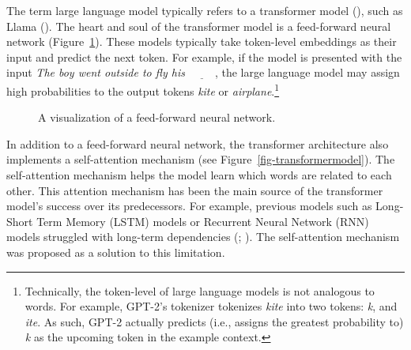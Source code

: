 \documentclass[
  12pt,
  letterpaper,
]{scrreport}
\begin{document}
The term large language model typically refers to a transformer model
(), such
as Llama ().
The heart and soul of the transformer model is a feed-forward neural
network (Figure~\ref{fig-neuralnet}). These models typically take
token-level embeddings as their input and predict the next token. For
example, if the model is presented with the input \emph{The boy went
outside to fly his} \(\underline{\hspace{1cm}}\), the large language
model may assign high probabilities to the output tokens \emph{kite} or
\emph{airplane}.\footnote{Technically, the token-level of large language
  models is not analogous to words. For example, GPT-2's tokenizer
  tokenizes \emph{kite} into two tokens: \emph{k}, and \emph{ite}. As
  such, GPT-2 actually predicts (i.e., assigns the greatest probability
  to) \emph{k} as the upcoming token in the example context.}

\begin{figure}[htbp]

\caption{\label{fig-neuralnet}A visualization of a feed-forward neural
network.}


\end{figure}%

In addition to a feed-forward neural network, the transformer
architecture also implements a self-attention mechanism (see
Figure~\ref{fig-transformermodel}). The self-attention mechanism helps
the model learn which words are related to each other. This attention
mechanism has been the main source of the transformer model's success
over its predecessors. For example, previous models such as Long-Short
Term Memory (LSTM) models or Recurrent Neural Network (RNN) models
struggled with long-term dependencies
(; ). The self-attention mechanism was proposed as a solution to this
limitation.
\end{document}
